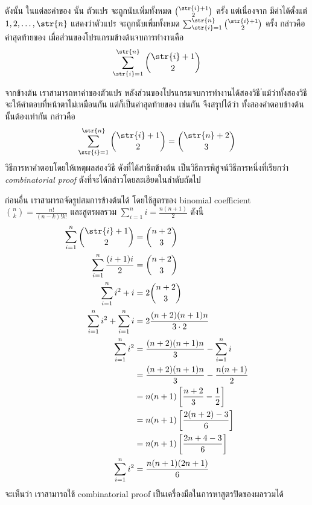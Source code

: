 \begin{example}
\begin{enumerate}[]
ดังนั้น ในแต่ละค่าของ  นั้น ตัวแปร  จะถูกนับเพิ่มทั้งหมด $\binom{\str{i}+1}{2}$ ครั้ง \enskip แต่เนื่องจาก  มีค่าได้ตั้งแต่ $1,2,\ldots,\str{n}$ แสดงว่าตัวแปร  จะถูกนับเพิ่มทั้งหมด $\sum_{\str{i}=1}^{\str{n}}{\binom{\str{i}+1}{2}}$ ครั้ง กล่าวคือ ค่าสุดท้ายของ  เมื่อส่วนของโปรแกรมข้างต้นจบการทำงานคือ \[\sum_{\str{i}=1}^{\str{n}}{\binom{\str{i}+1}{2}}\]
\end{enumerate}
จากข้างต้น เราสามารถหาค่าของตัวแปร  หลังส่วนของโปรแกรมจบการทำงานได้สองวิธี ่แม้ว่าทั้งสองวิธีจะให้คำตอบที่หน้าตาไม่เหมือนกัน แต่ก็เป็นค่าสุดท้ายของ  เช่นกัน จึงสรุปได้ว่า ทั้งสองคำตอบข้างต้นนั้นต้องเท่ากัน กล่าวคือ 
\[\sum_{\str{i}=1}^{\str{n}}{\binom{\str{i}+1}{2}}=\binom{\str{n}+2}{3}\]
วิธีการหาคำตอบโดยให้เหตุผลสองวิธี ดังที่ได้สาธิตข้างต้น เป็นวิธีการพิสูจน์วิธีการหนึ่งที่เรียกว่า \emph{combinatorial proof} ดังที่จะได้กล่าวโดยละเอียดในลำดับถัดไป

ก่อนอื่น เราสามารถจัดรูปสมการข้างต้นได้ โดยใช้สูตรของ binomial coefficient $\binom{n}{k}=\frac{n!}{(n-k)!k!}$ และสูตรผลรวม $\sum_{i=1}^{n}{i}=\frac{n(n+1)}{2}$ ดังนี้
\begin{align*}
\sum_{i=1}^{n}{\binom{\str{i}+1}{2}} &= \binom{n+2}{3} \\
\sum_{i=1}^{n}{\frac{(i+1)i}{2}} &= \binom{n+2}{3} \\
\sum_{i=1}^{n}{i^2+i} &= 2\binom{n+2}{3} \\
\sum_{i=1}^{n}{i^2}+\sum_{i=1}^{n}{i} &= 2\frac{(n+2)(n+1)n}{3\cdot 2} \\
\sum_{i=1}^{n}{i^2} &= \frac{(n+2)(n+1)n}{3}-\sum_{i=1}^{n}{i} \\
&= \frac{(n+2)(n+1)n}{3}-\frac{n(n+1)}{2} \\
&= n(n+1)\left[\frac{n+2}{3}-\frac{1}{2}\right] \\
&= n(n+1)\left[\frac{2(n+2)-3}{6}\right] \\
&= n(n+1)\left[\frac{2n+4-3}{6}\right] \\
\sum_{i=1}^{n}{i^2} &= \frac{n(n+1)(2n+1)}{6}
\end{align*}
จะเห็นว่า เราสามารถใช้ combinatorial proof เป็นเครื่องมือในการหาสูตรปิดของผลรวมได้
\end{example}
